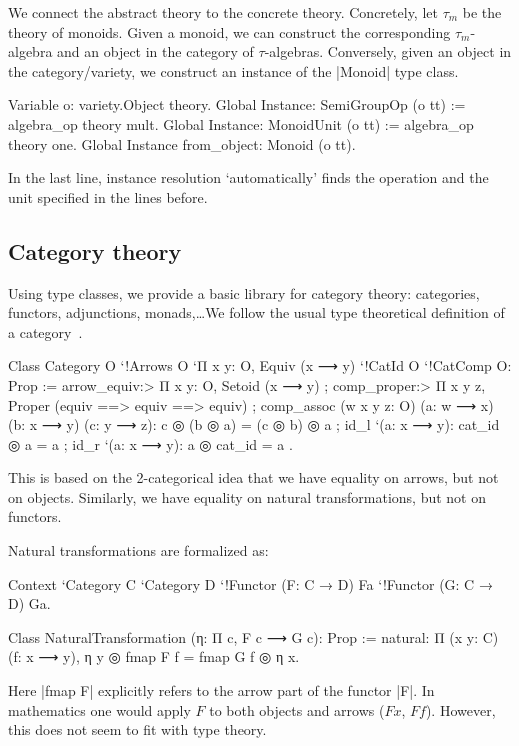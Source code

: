 \documentclass[a4paper,10pt, runningheads]{llncs}
\begin{document}
We connect the abstract theory to the concrete theory. Concretely, let $\tau_m$ be the theory
of monoids. Given a monoid, we can construct the corresponding $\tau_m$-algebra and an
object in the category of $\tau$-algebras. Conversely, given an object in the category/variety, we
construct an instance of the |Monoid| type class.
\begin{code}
Variable o: variety.Object theory.
Global Instance: SemiGroupOp (o tt) := algebra_op theory mult.
Global Instance: MonoidUnit (o tt) := algebra_op theory one.
Global Instance from_object: Monoid (o tt).
\end{code}
In the last line, instance resolution `automatically' finds the operation and the unit specified in
the lines before.

\subsection{Category theory}\label{cats}
Using type classes, we provide a basic library for category theory: categories, functors,
adjunctions, monads,\ldots We follow the usual type theoretical definition of a
category~\cite{saibi1995constructive}.

\begin{code}
Class Category O `{!Arrows O} `{Π x y: O, Equiv (x ⟶ y)}
  `{!CatId O} `{!CatComp O}: Prop :=
  { arrow_equiv:> Π x y: O, Setoid (x ⟶ y)
  ; comp_proper:> Π x y z,
      Proper (equiv ==> equiv ==> equiv)%
  ; comp_assoc (w x y z: O) (a: w ⟶ x) (b: x ⟶ y) (c: y ⟶ z):
      c ◎ (b ◎ a) = (c ◎ b) ◎ a
  ; id_l `(a: x ⟶ y): cat_id ◎ a = a
  ; id_r `(a: x ⟶ y): a ◎ cat_id = a }.
\end{code}
This is based on the 2-categorical idea that we have equality on arrows, but not on objects.
Similarly, we have equality on natural transformations, but not on functors.

Natural transformations are formalized as:
\begin{code}
  Context `{Category C} `{Category D}
  `{!Functor (F: C → D) Fa} `{!Functor (G: C → D) Ga}.

  Class NaturalTransformation (η: Π c, F c ⟶ G c): Prop :=
    natural: Π (x y: C) (f: x ⟶ y), η y ◎ fmap F f = fmap G f ◎ η x.
\end{code}

Here |fmap F| explicitly refers to the arrow part of the functor |F|.
In mathematics one would apply $F$ to both objects and arrows ($F x$, $F f$). However, this does
not seem to fit with type theory.
\end{document}

